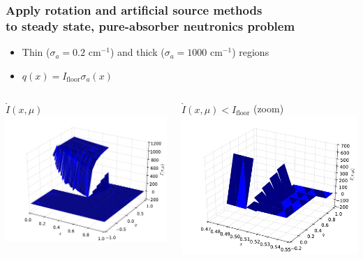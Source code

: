 \documentclass[xcolor=dvipsnames,hyperref={pdfpagelabels=false},unknownkeysallowed]{beamer}
\renewcommand{\u}[1]{\underline{#1}}
\newlength{\wideitemsep}
\let\olditem\item
\renewcommand{\item}{\setlength{\itemsep}{\wideitemsep}\olditem}
\begin{document}
\begin{frame}
    \frametitle{Apply rotation and artificial source methods   \\ to steady state, pure-absorber  neutronics problem}
    {\addtolength{\leftmargini}{-1.2cm}
    \begin{itemize}
        \item Thin ($\sigma_a=0.2$ cm$^{-1}$) and thick ($\sigma_a=1000$ cm$^{-1}$)
            regions 
            \vspace{-0.15in}
        \item $q(x)={I_{\text{floor}}}{\sigma_a(x)}$ 
    \end{itemize}
}
\vspace{0.2in}
    \begin{columns}
    \begin{column}{0.5\textwidth}
        \vspace{0pt}
  \centering
  \u{${\tilde I(x,\mu)}$}
    \includegraphics[width=\linewidth]{neut_ang_full.pdf}
    \end{column}
    \begin{column}{0.5\textwidth}
        \vspace{0pt}
        \centering
    \u{${\tilde I(x,\mu)}<I_{\text{floor}}$} (zoom)
        \includegraphics[width=\linewidth]{neut_ang_zoom.pdf}

\end{column}
\end{columns}
\end{frame}
\end{document}
